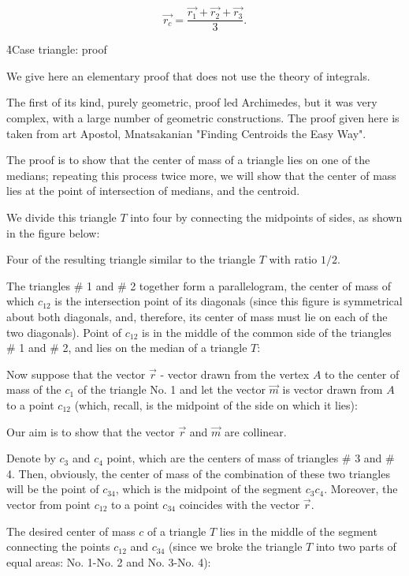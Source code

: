 $$ \vec{r_c} = \frac{ \vec{r_1} + \vec{r_2} + \vec{r_3} }{ 3 }. $$

\h4{Case triangle: proof}

We give here an elementary proof that does not use the theory of integrals. 

The first of its kind, purely geometric, proof led Archimedes, but it was very complex, with a large number of geometric constructions. The proof given here is taken from art Apostol, Mnatsakanian "Finding Centroids the Easy Way".

The proof is to show that the center of mass of a triangle lies on one of the medians; repeating this process twice more, we will show that the center of mass lies at the point of intersection of medians, and the centroid.

We divide this triangle $T$ into four by connecting the midpoints of sides, as shown in the figure below:


Four of the resulting triangle similar to the triangle $T$ with ratio $1/2$.

The triangles # 1 and # 2 together form a parallelogram, the center of mass of which $c_{12}$ is the intersection point of its diagonals (since this figure is symmetrical about both diagonals, and, therefore, its center of mass must lie on each of the two diagonals). Point of $c_{12}$ is in the middle of the common side of the triangles # 1 and # 2, and lies on the median of a triangle $T$:


Now suppose that the vector $\vec{r}$ - vector drawn from the vertex $A$ to the center of mass of the $c_1$ of the triangle No. 1 and let the vector $\vec{m}$ is vector drawn from $A$ to a point $c_{12}$ (which, recall, is the midpoint of the side on which it lies):


Our aim is to show that the vector $\vec{r}$ and $\vec{m}$ are collinear.

Denote by $c_3$ and $c_4$ point, which are the centers of mass of triangles # 3 and # 4. Then, obviously, the center of mass of the combination of these two triangles will be the point of $c_{34}$, which is the midpoint of the segment $c_3 c_4$. Moreover, the vector from point $c_{12}$ to a point $c_{34}$ coincides with the vector $\vec{r}$.

The desired center of mass $c$ of a triangle $T$ lies in the middle of the segment connecting the points $c_{12}$ and $c_{34}$ (since we broke the triangle $T$ into two parts of equal areas: No. 1-No. 2 and No. 3-No. 4):

